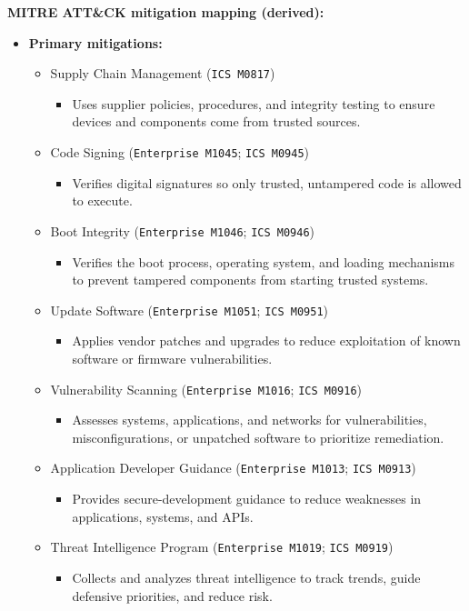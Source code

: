 \documentclass[10pt,a4paper,oneside]{report}
\begin{document}
\textbf{MITRE ATT\&CK mitigation mapping (derived):}

\begin{itemize}
\item \textbf{Primary mitigations:}
\begin{itemize}
\item Supply Chain Management (\texttt{ICS M0817})
\begin{itemize}
\item Uses supplier policies, procedures, and integrity testing to ensure devices and components come from trusted sources.
\end{itemize}
\item Code Signing (\texttt{Enterprise M1045}; \texttt{ICS M0945})
\begin{itemize}
\item Verifies digital signatures so only trusted, untampered code is allowed to execute.
\end{itemize}
\item Boot Integrity (\texttt{Enterprise M1046}; \texttt{ICS M0946})
\begin{itemize}
\item Verifies the boot process, operating system, and loading mechanisms to prevent tampered components from starting trusted systems.
\end{itemize}
\item Update Software (\texttt{Enterprise M1051}; \texttt{ICS M0951})
\begin{itemize}
\item Applies vendor patches and upgrades to reduce exploitation of known software or firmware vulnerabilities.
\end{itemize}
\item Vulnerability Scanning (\texttt{Enterprise M1016}; \texttt{ICS M0916})
\begin{itemize}
\item Assesses systems, applications, and networks for vulnerabilities, misconfigurations, or unpatched software to prioritize remediation.
\end{itemize}
\item Application Developer Guidance (\texttt{Enterprise M1013}; \texttt{ICS M0913})
\begin{itemize}
\item Provides secure-development guidance to reduce weaknesses in applications, systems, and APIs.
\end{itemize}
\item Threat Intelligence Program (\texttt{Enterprise M1019}; \texttt{ICS M0919})
\begin{itemize}
\item Collects and analyzes threat intelligence to track trends, guide defensive priorities, and reduce risk.
\end{itemize}
\end{itemize}
\end{itemize}
\end{document}
